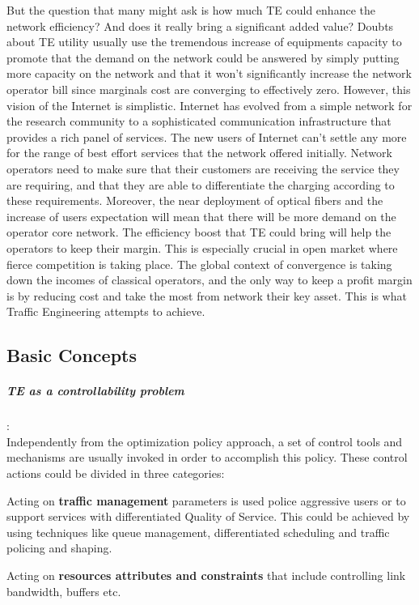 But the question that many might ask is how much TE could enhance the network efficiency? And does it really bring a significant added value? Doubts about TE utility usually use the tremendous increase of equipments capacity to promote that the demand on the network could be answered by simply putting more capacity on the network and that it won't significantly increase the network operator bill since marginals cost are converging to effectively zero. However, this vision of the Internet is simplistic. Internet has evolved from a simple network for the research community to a sophisticated communication infrastructure that provides a rich panel of services. The new users of Internet can't settle any more for the range of best  effort services that the network offered initially. Network operators need to make sure that their customers are receiving the service they are requiring, and that they are able to differentiate the charging according to  these requirements. Moreover, the near deployment of  optical fibers and the increase of users expectation will mean that there will be more demand on the operator core network. The efficiency boost that TE could bring will help the operators to keep their margin. This is especially crucial in open market where fierce competition is taking place. The global context of convergence is taking down the incomes of classical operators, and the only way to keep a profit margin is by reducing cost and take the most from network their key asset. This is what Traffic Engineering attempts to achieve.

\subsection{Basic Concepts}

\subparagraph{TE as a controllability problem }:
\\Independently from the optimization policy approach, a set of control tools and mechanisms are usually invoked in order to accomplish this policy. These control actions could be divided in three categories: 

Acting on {\bf traffic management} parameters is used police aggressive users or to support services with differentiated Quality of Service. This could be achieved by using techniques like queue management, differentiated scheduling and traffic policing and shaping.

Acting on {\bf resources attributes and constraints} that include controlling link bandwidth, buffers etc.
 

